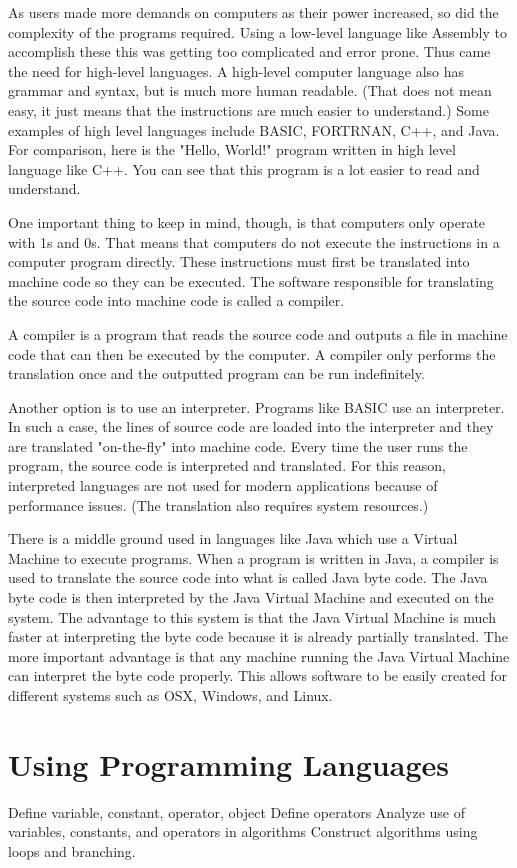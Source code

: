 

As users made more demands on computers as their power increased, so did the complexity of the programs required. Using a low-level language like Assembly to accomplish these this was getting too complicated and error prone. Thus came the need for high-level languages. A high-level computer language also has grammar and syntax, but is much more human readable. (That does not mean easy, it just means that the instructions are much easier to understand.) Some examples of high level languages include BASIC, FORTRNAN, C++, and Java.
For comparison, here is the "Hello, World!" program written in high level language like C++. You can see that this program is a lot easier to read and understand.



One important thing to keep in mind, though, is that computers only operate with 1s and 0s. That means that computers do not execute the instructions in a computer program directly. These instructions must first be translated into machine code so they can be executed. The software responsible for translating the source code into machine code is called a compiler.

A compiler is a program that reads the source code and outputs a file in machine code that can then be executed by the computer. A compiler only performs the translation once and the outputted program can be run indefinitely.

Another option is to use an interpreter. Programs like BASIC use an interpreter. In such a case, the lines of source code are loaded into the interpreter and they are translated "on-the-fly" into machine code. Every time the user runs the program, the source code is interpreted and translated. For this reason, interpreted languages are not used for modern applications because of performance issues. (The translation also requires system resources.)

There is a middle ground used in languages like Java which use a Virtual Machine to execute programs. When a program is written in Java, a compiler is used to translate the source code into what is called Java byte code. The Java byte code is then interpreted by the Java Virtual Machine and executed on the system. The advantage to this system is that the Java Virtual Machine is much faster at interpreting the byte code because it is already partially translated. The more important advantage is that any machine running the Java Virtual Machine can interpret the byte code properly. This allows software to be easily created for different systems such as OSX, Windows, and Linux.

\section{Using Programming Languages}

Define variable, constant, operator, object
Define operators
Analyze use of variables, constants, and operators in algorithms
Construct algorithms using loops and branching.

